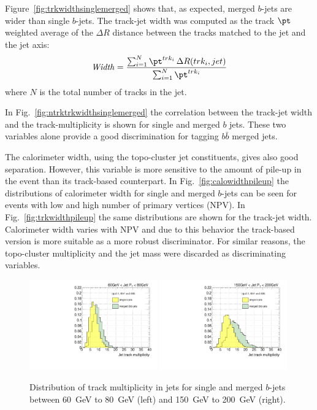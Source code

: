 Figure~\ref{fig:trkwidthsinglemerged} shows that, as expected, merged $b$-jets are wider than single $b$-jets. The track-jet width was computed as the track $\pt$ weighted average of the $\Delta R$ distance between the tracks matched to the jet and the jet axis:
\begin{equation*} 
{\it Width} = \frac{\sum_{i=1}^N \pt^{trk_i} \,\Delta R (trk_i,jet) }{\sum_{i=1}^N \pt^{trk_i} }
\end{equation*} 
where $N$ is the total number of tracks in the jet.


In Fig.~\ref{fig:ntrktrkwidthsinglemerged} the correlation between the track-jet width and the track-multiplicity is shown for single and merged $b$ jets. These two variables alone provide a good discrimination for tagging $b \bar{b}$ merged jets.


The calorimeter width, using the topo-cluster jet constituents, gives also good separation. However, this variable is more sensitive to the amount of pile-up in the event than its track-based counterpart. In Fig.~\ref{fig:calowidthpileup} the distributions of calorimeter width for single and merged $b$-jets can be seen for events with low and high number of primary vertices (NPV). In Fig.~\ref{fig:trkwidthpileup} the same distributions are shown for the track-jet width. Calorimeter width varies %
with NPV and due to this behavior the track-based version is more suitable as a more robust discriminator. For similar reasons, the topo-cluster multiplicity and the jet mass were discarded as discriminating variables.


\begin{figure}[tp]
\centering
\includegraphics[width=0.49\textwidth]{FIGS/VarsSingleMerged/Ntrk060.pdf}
\includegraphics[width=0.49\textwidth]{FIGS/VarsSingleMerged/Ntrk150.pdf}
\caption{Distribution of track multiplicity in jets for single and merged $b$-jets between 60~GeV to 80~GeV (left) and 150~GeV to 200~GeV (right).}
\label{fig:ntrksinglemerged}
\end{figure}

